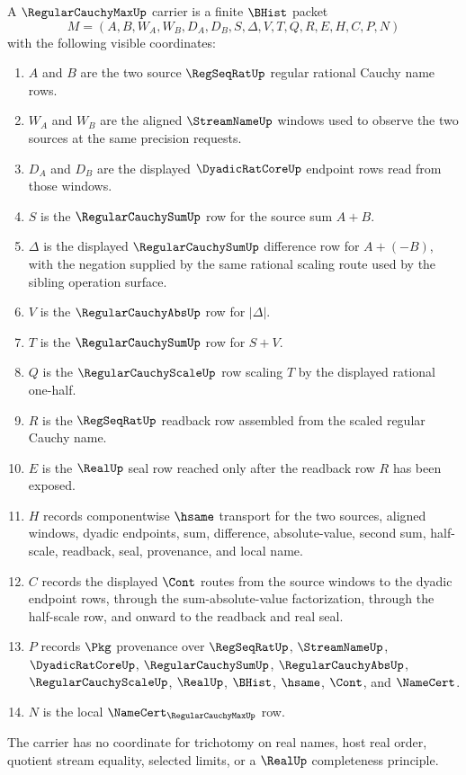 \begin{definition}
\label{def:regular-cauchy-max-carrier}
A $\RegularCauchyMaxUp$ carrier is a finite $\BHist$ packet
$$
M=(A,B,W_A,W_B,D_A,D_B,S,\Delta,V,T,Q,R,E,H,C,P,N)
$$
with the following visible coordinates:
\begin{enumerate}
\item $A$ and $B$ are the two source $\RegSeqRatUp$ regular rational Cauchy name rows.
\item $W_A$ and $W_B$ are the aligned $\StreamNameUp$ windows used to observe the two sources at the same precision requests.
\item $D_A$ and $D_B$ are the displayed $\DyadicRatCoreUp$ endpoint rows read from those windows.
\item $S$ is the $\RegularCauchySumUp$ row for the source sum $A+B$.
\item $\Delta$ is the displayed $\RegularCauchySumUp$ difference row for $A+(-B)$, with the negation supplied by the same rational scaling route used by the sibling operation surface.
\item $V$ is the $\RegularCauchyAbsUp$ row for $|\Delta|$.
\item $T$ is the $\RegularCauchySumUp$ row for $S+V$.
\item $Q$ is the $\RegularCauchyScaleUp$ row scaling $T$ by the displayed rational one-half.
\item $R$ is the $\RegSeqRatUp$ readback row assembled from the scaled regular Cauchy name.
\item $E$ is the $\RealUp$ seal row reached only after the readback row $R$ has been exposed.
\item $H$ records componentwise $\hsame$ transport for the two sources, aligned windows, dyadic endpoints, sum, difference, absolute-value, second sum, half-scale, readback, seal, provenance, and local name.
\item $C$ records the displayed $\Cont$ routes from the source windows to the dyadic endpoint rows, through the sum-absolute-value factorization, through the half-scale row, and onward to the readback and real seal.
\item $P$ records $\Pkg$ provenance over $\RegSeqRatUp$, $\StreamNameUp$, $\DyadicRatCoreUp$, $\RegularCauchySumUp$, $\RegularCauchyAbsUp$, $\RegularCauchyScaleUp$, $\RealUp$, $\BHist$, $\hsame$, $\Cont$, and $\NameCert$.
\item $N$ is the local $\NameCert_{\RegularCauchyMaxUp}$ row.
\end{enumerate}
The carrier has no coordinate for trichotomy on real names, host real order, quotient stream equality, selected limits, or a $\RealUp$ completeness principle.
\end{definition}

